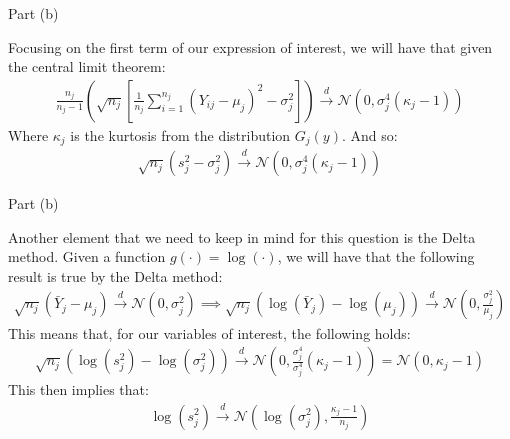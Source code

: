 \begin{frame}{Part (b)}
    
    Focusing on the first term of our expression of interest, we will have that given the central limit theorem:
    \begin{align*}
        \frac{n_j}{n_j - 1} \left( \sqrt{n_j} \left[ \frac{1}{n_j} \sum_{i=1}^{n_j} (Y_{ij} - \mu_j)^2 - \sigma_j^2 \right]  \right) \xrightarrow{d} \mathcal{N} (0, \sigma_j^4(\kappa_j - 1))
    \end{align*}
    Where $\kappa_j$ is the kurtosis from the distribution $G_j(y)$. And so:
    \begin{align*}
        \sqrt{n_j}(s_j^2 - \sigma_j^2) \xrightarrow{d} \mathcal{N} (0, \sigma_j^4(\kappa_j - 1))
    \end{align*}
    
\end{frame}

\begin{frame}{Part (b)}

     Another element that we need to keep in mind for this question is the Delta method. Given a function $g(\cdot) = \log(\cdot)$, we will have that the following result is true by the Delta method:
    \begin{align*}
        \sqrt{n_j}(\bar{Y}_j - \mu_j) \xrightarrow{d} \mathcal{N} (0, \sigma_j^2) \implies \sqrt{n_j}(\log(\bar{Y}_j) - \log(\mu_j)) \xrightarrow{d} \mathcal{N} \left(0, \frac{\sigma_j^2}{\mu_j}\right)
    \end{align*}
    This means that, for our variables of interest, the following holds:
    \begin{align*}
        \sqrt{n_j}(\log(s^2_j) - \log(\sigma^2_j)) \xrightarrow{d} \mathcal{N} \left(0, \frac{\sigma_j^4}{\sigma_j^4}(\kappa_j - 1) \right) = \mathcal{N} \left(0, \kappa_j - 1 \right)
    \end{align*}
    This then implies that:
    \begin{align*}
        \log(s^2_j) \xrightarrow{d} \mathcal{N} \left(\log (\sigma^2_j), \frac{\kappa_j - 1}{n_j} \right)
    \end{align*}
    
\end{frame}

